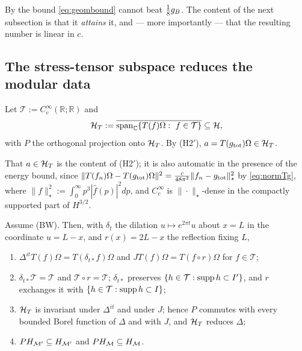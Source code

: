 By  the bound \eqref{eq:geombound} cannot beat $\frac18g_{B}$.  The content of the next
subsection is that it \emph{attains} it, and --- more importantly --- that the resulting number is linear
in $c$.

\subsection{The stress-tensor subspace reduces the modular data}\label{ss:HT}

\begin{definition}\label{def:HT}
Let $\mathcal T:=C_{c}^{\infty}(\mathbb R;\mathbb R)$ and
\begin{equation}\label{eq:HTdef}
 \mathcal H_T:=\overline{\mathrm{span}_{\mathbb C}\{T(f)\Omega:\ f\in\mathcal T\}}\subseteq\mathcal H ,
\end{equation}
with $P$ the orthogonal projection onto $\mathcal H_T$.  By (H2$'$), $a=T(g_{\rm tot})\Omega\in\mathcal H_T$.
\end{definition}

That $a\in\mathcal H_T$ is the content of (H2$'$); it is also automatic in the presence of the energy bound, since
$\|T(f_{n})\Omega-T(g_{\rm tot})\Omega\|^{2}=\frac{c}{48\pi^{2}}\|f_{n}-g_{\rm tot}\|_{\star}^{2}$ by
\eqref{eq:normTg}, where $\|f\|_{\star}^{2}:=\int_{0}^{\infty}p^{3}|\hat f(p)|^{2}dp$, and $C_{c}^{\infty}$
is $\|\cdot\|_{\star}$-dense in the compactly supported part of $H^{3/2}$.

\begin{lemma}\label{lem:reduce}
Assume \textup{(BW)}.  Then, with $\delta_{t}$ the dilation $u\mapsto e^{2\pi t}u$ about $x=L$ in the
coordinate $u=L-x$, and $r(x)=2L-x$ the reflection fixing $L$,
\begin{enumerate}[label=\textup{(\roman*)},leftmargin=2.4em]
\item $\Delta^{it}T(f)\Omega=T(\delta_{t*}f)\Omega$ and $JT(f)\Omega=T(f\circ r)\Omega$ for $f\in\mathcal T$;
\item $\delta_{t*}\mathcal T=\mathcal T$ and $\mathcal T\circ r=\mathcal T$; $\delta_{t*}$ preserves
 $\{h\in\mathcal T:\operatorname{supp} h\subset I'\}$, and $r$ exchanges it with $\{h\in\mathcal T:\operatorname{supp} h\subset I\}$;
\item $\mathcal H_T$ is invariant under $\Delta^{it}$ and under $J$; hence $P$ commutes with every bounded Borel
 function of $\Delta$ and with $J$, and $\mathcal H_T$ reduces $\Delta$;
\item $PH_{\mathcal M'}\subseteq H_{\mathcal M'}$ and $PH_{\mathcal M}\subseteq H_{\mathcal M}$.
\end{enumerate}
\end{lemma}


